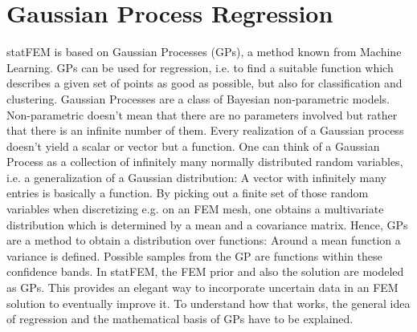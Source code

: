 \documentclass[%
  a4paper,oneside,%
  11pt,%
  smallchapters,
  style=printdev,
  extramargin,
  green,%
  rgb, <cmyk>
  ]{tubsbook}
\begin{document}
\section{Gaussian Process Regression}
statFEM is based on Gaussian Processes (GPs), a method known from Machine Learning. \cite{murphy2012} GPs can be used for regression, i.e. to find a suitable function which describes a given set of points as good as possible, but also for classification and clustering. \cite{gortler2019} 
Gaussian Processes are a class of Bayesian non-parametric models. Non-parametric doesn't mean that there are no parameters involved but rather that there is an infinite number of them. \cite{gortler2019} Every realization of a Gaussian process doesn't yield a scalar or vector but a function. One can think of a Gaussian Process as a collection of infinitely many normally distributed random variables, i.e. a generalization of a Gaussian distribution: A vector with infinitely many entries is basically a function. By picking out a finite set of those random variables when discretizing e.g. on an FEM mesh, one obtains a multivariate distribution which is determined by a mean and a covariance matrix. \cite[p. 2]{rasmussen2006} Hence, GPs are a method to obtain a distribution over functions: Around a mean function a variance is defined. Possible samples from the GP are functions within these confidence bands. In statFEM, the FEM prior and also the solution are modeled as GPs. This provides an elegant way to incorporate uncertain data in an FEM solution to eventually improve it. To understand how that works, the general idea of regression and the mathematical basis of GPs have to be explained.
\end{document}
